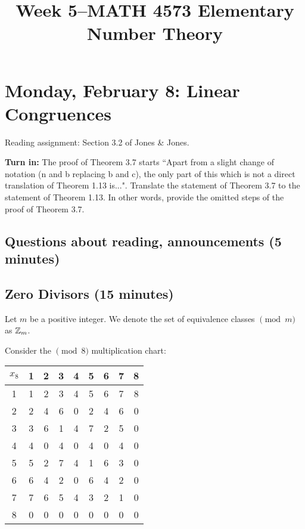 \documentclass[letterpaper, 11 pt]{article}
\title{Week 5--MATH 4573 Elementary Number Theory}
\begin{document}
\maketitle
\tableofcontents

\section{Monday, February 8: Linear Congruences}
Reading assignment: Section 3.2 of Jones \& Jones.

{\bf Turn in:}  The proof of Theorem 3.7 starts ``Apart from a slight change of notation (n and b replacing b and c), the only part of this which is not a direct translation of Theorem 1.13 is...". Translate the statement of Theorem 3.7 to the statement of Theorem 1.13. In other words, provide the omitted steps of the proof of Theorem 3.7.

\subsection{Questions about reading, announcements (5 minutes)}



\subsection{Zero Divisors (15 minutes)}
\begin{defn}
 Let $m$ be a positive integer. We denote the set of equivalence classes $\pmod m$ as $\mathbb Z_m$.
\end{defn}

Consider the $\!\!\pmod8$ multiplication chart: 

\begin{tabular}{|c||c|c|c|c|c|c|c|c|}\hline
$x_8$ & 1& 2&3&4&5&6&7&8\\\hline\hline
 1 & 1&2&3&4&5&6&7&8\\\hline
 2&2&4&6&0&2&4&6&0\\\hline
 3&3&6&1&4&7&2&5&0\\\hline
 4&4&0&4&0&4&0&4&0\\\hline
 5&5&2&7&4&1&6&3&0\\\hline
 6&6&4&2&0&6&4&2&0\\\hline
 7&7&6&5&4&3&2&1&0\\\hline
 8&0&0&0&0&0&0&0&0\\\hline
\end{tabular}
\end{document}

